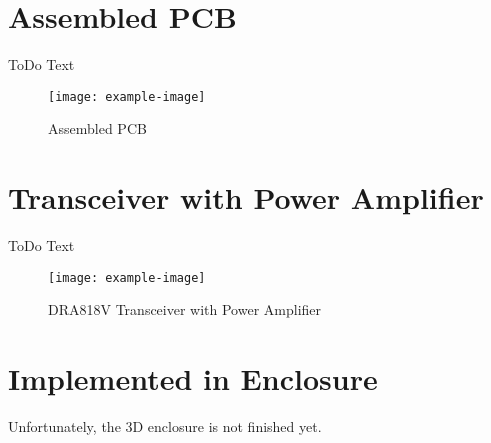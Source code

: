 \section{Assembled PCB}
	ToDo Text
	\begin{figure}[h]
		\centering
		\texttt{[image: example-image]}
		\caption{Assembled PCB}
		\label{fig:Assembled PCB}
	\end{figure}
	\newpage

\section{Transceiver with Power Amplifier}
	ToDo Text
	\begin{figure}[h]
		\centering
		\texttt{[image: example-image]}
		\caption{DRA818V Transceiver with Power Amplifier}
		\label{fig:TRX+PA}
	\end{figure}
	
\section{Implemented in Enclosure}
Unfortunately, the 3D enclosure is not finished yet.